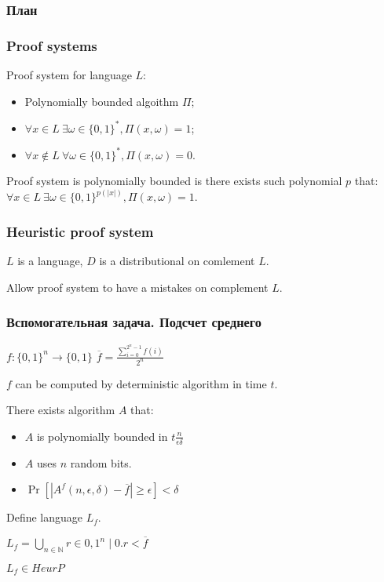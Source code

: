 \begin{frame}
    \frametitle{План}
\end{frame}

\begin{frame}
	\frametitle{Proof systems}

    \begin{definition}
        Proof system for language $L$:
        \begin{itemize}
            \item Polynomially bounded algoithm $\Pi$;
            \item $\forall x \in L~ \exists \omega \in \{0, 1\}^{*}, \Pi(x, \omega) = 1$;
        	\item $\forall x \notin L~ \forall \omega \in \{0, 1\}^{*}, 
        		\Pi(x, \omega) = 0$.
        \end{itemize}
    \end{definition}

    Proof system is polynomially bounded is there exists such polynomial $p$ that:
    $\forall x \in L~ \exists \omega \in \{0, 1\}^{p(|x|)}, \Pi(x, \omega) = 1$.
\end{frame}

\begin{frame}
    \frametitle{Heuristic proof system}

    $L$ is a language, $D$ is a distributional on comlement $L$.

    Allow proof system to have a mistakes on complement $L$.

    
    


\end{frame}

\begin{frame}
    \frametitle{Вспомогательная задача. Подсчет среднего}

    $f:\{0, 1\}^{n} \rightarrow \{0, 1\}$
    $\overline{f} = \frac{\sum\limits_{i = 0}^{2^n - 1}f(i)}{2^n}$

    $f$ can be computed by deterministic algorithm in time $t$.

    \begin{proposition}%
        There exists algorithm $A$ that:
        \begin{itemize}
	        \item $A$ is polynomially bounded in $t\frac{n}{\epsilon\delta}$
        	\item $A$ uses $n$ random bits.
        	\item $\Pr[|A^{f}(n, \epsilon, \delta) - \overline{f}| \ge \epsilon] <
		        \delta$
        \end{itemize}
    \end{proposition}

    Define language $L_f$.

    $L_f = \bigcup\limits_{n \in \mathbb{N}}{r \in {0, 1}^n \mid 0.r < \overline{f}}$

    \begin{lemma}
        $L_f \in HeurP$
    \end{lemma}
\end{frame}

